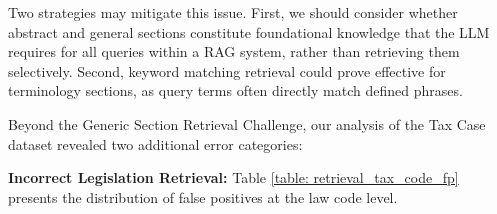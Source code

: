 Two strategies may mitigate this issue. First, we should consider whether abstract and general sections constitute foundational knowledge that the LLM requires for all queries within a RAG system, rather than retrieving them selectively. Second, keyword matching retrieval could prove effective for terminology sections, as query terms often directly match defined phrases.

Beyond the Generic Section Retrieval Challenge, our analysis of the Tax Case dataset revealed two additional error categories:

\textbf{Incorrect Legislation Retrieval:} Table \ref{table: retrieval_tax_code_fp} presents the distribution of false positives at the law code level.



